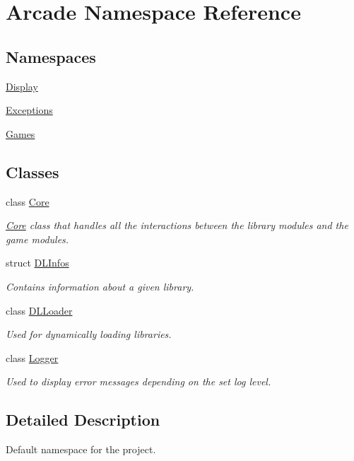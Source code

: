 \hypertarget{namespaceArcade}{}\section{Arcade Namespace Reference}
\label{namespaceArcade}
\subsection*{Namespaces}
\begin{DoxyCompactItemize}
\item 
 \mbox{\hyperlink{namespaceArcade_1_1Display}{Display}}
\item 
 \mbox{\hyperlink{namespaceArcade_1_1Exceptions}{Exceptions}}
\item 
 \mbox{\hyperlink{namespaceArcade_1_1Games}{Games}}
\end{DoxyCompactItemize}
\subsection*{Classes}
\begin{DoxyCompactItemize}
\item 
class \mbox{\hyperlink{classArcade_1_1Core}{Core}}
\begin{DoxyCompactList}\small\item\em \mbox{\hyperlink{classArcade_1_1Core}{Core}} class that handles all the interactions between the library modules and the game modules. \end{DoxyCompactList}\item 
struct \mbox{\hyperlink{structArcade_1_1DLInfos}{D\+L\+Infos}}
\begin{DoxyCompactList}\small\item\em Contains information about a given library. \end{DoxyCompactList}\item 
class \mbox{\hyperlink{classArcade_1_1DLLoader}{D\+L\+Loader}}
\begin{DoxyCompactList}\small\item\em Used for dynamically loading libraries. \end{DoxyCompactList}\item 
class \mbox{\hyperlink{classArcade_1_1Logger}{Logger}}
\begin{DoxyCompactList}\small\item\em Used to display error messages depending on the set log level. \end{DoxyCompactList}\end{DoxyCompactItemize}


\subsection{Detailed Description}
Default namespace for the project. 